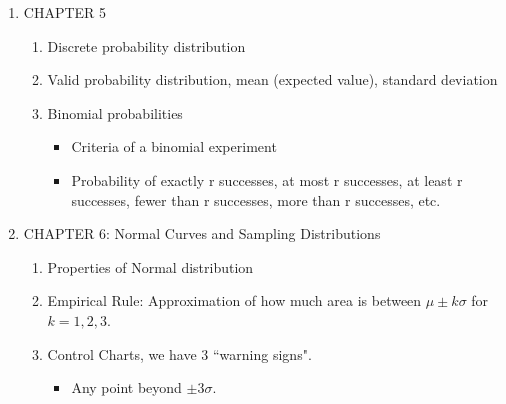 \documentclass{article}
\begin{document}
\begin{enumerate}
\begin{enumerate}
\begin{itemize}
                \end{itemize}
                
        \end{enumerate}
        
    \item CHAPTER 5 
    
        \begin{enumerate}
        
            \item Discrete probability distribution
            
            \item Valid probability distribution, mean (expected value), standard deviation
            
            \item Binomial probabilities
            
                \begin{itemize}
                
                    \item Criteria of a binomial experiment
                    
                    \item Probability of exactly r successes, at most r successes, at least r successes, fewer than r successes, more than r successes, etc.
                    
                \end{itemize}
        \end{enumerate}
    
    \item CHAPTER 6: Normal Curves and Sampling Distributions
    
        \begin{enumerate}
        
        \item Properties of Normal distribution
        
        \item Empirical Rule: Approximation of how much area is between $\mu \pm k\sigma$ for $k=1,2,3$.
        
        \item Control Charts, we have 3 ``warning signs".
        
            \begin{itemize}
            
                \item Any point beyond $\pm 3\sigma$.
                

\end{itemize}
\end{enumerate}
\end{enumerate}
\end{document}
